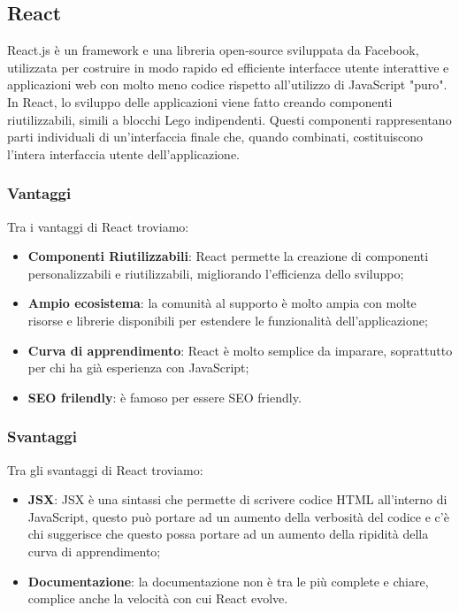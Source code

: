 \subsection*{React}
React.js è un framework e una libreria open-source sviluppata da Facebook, utilizzata per costruire in modo rapido ed efficiente interfacce utente interattive e applicazioni web con molto meno codice rispetto all'utilizzo di JavaScript "puro".\\

In React, lo sviluppo delle applicazioni viene fatto creando componenti riutilizzabili, simili a blocchi Lego indipendenti. Questi componenti rappresentano parti individuali di un'interfaccia finale che, quando combinati, costituiscono l'intera interfaccia utente dell'applicazione.
\subsubsection*{Vantaggi}
Tra i vantaggi di React troviamo:
\begin{itemize}
    \item \textbf{Componenti Riutilizzabili}: React permette la creazione di componenti personalizzabili e riutilizzabili, migliorando l'efficienza dello sviluppo;
    \item \textbf{Ampio ecosistema}: la comunità al supporto è molto ampia con molte risorse e librerie disponibili per estendere le funzionalità dell'applicazione;
    \item \textbf{Curva di apprendimento}: React è molto semplice da imparare, soprattutto per chi ha già esperienza con JavaScript;
    \item \textbf{SEO frilendly}: è famoso per essere SEO friendly.
\end{itemize}

\subsubsection*{Svantaggi}
Tra gli svantaggi di React troviamo:
\begin{itemize}
    \item \textbf{JSX}: JSX è una sintassi che permette di scrivere codice HTML all'interno di JavaScript, questo può portare ad un aumento della verbosità del codice e c'è chi suggerisce che questo possa portare ad un aumento della ripidità della curva di apprendimento;
    \item \textbf{Documentazione}: la documentazione non è tra le più complete e chiare, complice anche la velocità con cui React evolve.

\end{itemize}


